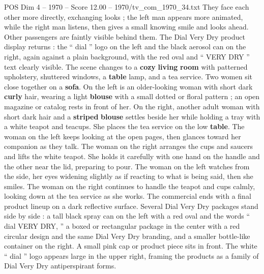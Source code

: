 \begin{textsample}{POS Dim 4 – 1970 – Score 12.00 – 1970/tv\_com\_1970\_34.txt}
They face each other more directly, exchanging looks ; the left man appears more animated, while the right man listens, then gives a small knowing smile and looks ahead.
Other passengers are faintly visible behind them.
The Dial Very Dry product display returns : the “ dial ” logo on the left and the black aerosol can on the right, again against a plain background, with the red oval and “ VERY DRY ” text clearly visible.
The scene changes to a \textbf{cozy} \textbf{living} \textbf{room} with patterned upholstery, shuttered windows, a \textbf{table} lamp, and a tea service.
Two women sit close together on a \textbf{sofa}.
On the left is an older-looking woman with short dark \textbf{curly} hair, wearing a light \textbf{blouse} with a small dotted or floral pattern ; an open magazine or catalog rests in front of her.
On the right, another adult woman with short dark hair and a \textbf{striped} \textbf{blouse} settles beside her while holding a tray with a white teapot and teacups.
She places the tea service on the low \textbf{table}.
The woman on the left keeps looking at the open pages, then glances toward her companion as they talk.
The woman on the right arranges the cups and saucers and lifts the white teapot.
She holds it carefully with one hand on the handle and the other near the lid, preparing to pour.
The woman on the left watches from the side, her eyes widening slightly as if reacting to what is being said, then she smiles.
The woman on the right continues to handle the teapot and cups calmly, looking down at the tea service as she works.
The commercial ends with a final product lineup on a dark reflective surface.
Several Dial Very Dry packages stand side by side : a tall black spray can on the left with a red oval and the words “ dial VERY DRY, ” a boxed or rectangular package in the center with a red circular design and the same Dial Very Dry branding, and a smaller bottle-like container on the right.
A small pink cap or product piece sits in front.
The white “ dial ” logo appears large in the upper right, framing the products as a family of Dial Very Dry antiperspirant forms.

\end{textsample}
